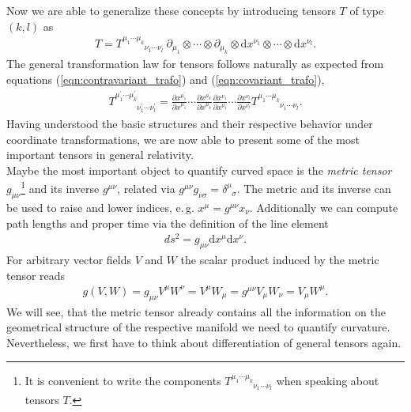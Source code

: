 Now we are able to generalize these concepts by introducing tensors $T$ of type $(k,l)$ as
\begin{align}
T=T_{\phantom{\mu_{1} \cdots \mu_{k}}\nu_{1} \cdots \nu_{l}}^{\mu_{1} \cdots \mu_{k}} \ \partial_{\mu_{1}} \otimes \cdots \otimes \partial_{\mu_{k}} \otimes \mathrm{d} x^{\nu_{1}} \otimes \cdots \otimes \mathrm{d} x^{\nu_{l}}.
\end{align}
The general transformation law for tensors follows naturally as expected from equations (\ref{eqn:contravariant_trafo}) and (\ref{eqn:covariant_trafo}),
\begin{align}
	T_{\phantom{\mu_{1}^{\prime} \cdots \mu_{k}^{\prime}}\nu_{1}^{\prime} \cdots \nu_{l}^{\prime}}^{\mu_{1}^{\prime} \cdots \mu_{k}^{\prime}}=\frac{\partial x^{\mu_{1}^{\prime}}}{\partial x^{\mu_{1}}} \cdots \frac{\partial x^{\mu_{k}^{\prime}}}{\partial x^{\mu_{k}}} \frac{\partial x^{\nu_{1}}}{\partial x^{\nu_{1}^{\prime}}} \cdots \frac{\partial x^{\nu_{l}}}{\partial x^{\nu_{l}^{\prime}}} T^{\mu_{1} \cdots \mu_{k}}_{\phantom{\mu_{1} \cdots \mu_{k}}\nu_{1} \cdots \nu_{l}}.
\end{align}
Having understood the basic structures and their respective behavior under coordinate transformations, we are now able to present some of the most important tensors in general relativity. \\
Maybe the most important object to quantify curved space is the \textit{metric tensor} $g_{\mu\nu}$\footnote{It is convenient to write the components $T_{\phantom{\mu_{1} \cdots \mu_{k}}\nu_{1} \cdots \nu_{l}}^{\mu_{1} \cdots \mu_{k}}$ when speaking about tensors $T$.} and its inverse  $g^{\mu\nu}$, related via $g^{\mu\nu}g_{\nu\sigma} = \delta^{\mu}_{\phantom{\mu}\sigma}$. The metric and its inverse can be used to raise and lower indices, e.\,g. $x^{\mu} = g^{\mu\nu}x_{\nu}$. Additionally we can compute path lengths and proper time via the definition of the line element 
\begin{align}
	d s^{2}=g_{\mu \nu} \mathrm{d} x^{\mu} \mathrm{d} x^{\nu}.
\end{align}
For arbitrary vector fields $V$ and $W$ the scalar product induced by the metric tensor reads
\begin{align}
	g(V,W) = g_{\mu\nu}V^{\mu}W^{\nu} = V^{\mu}W_{\mu}= g^{\mu\nu}V_{\mu}W_{\nu} = V_{\mu}W^{\mu}.
\end{align}
We will see, that the metric tensor already contains all the information on the geometrical structure of the respective manifold we need to quantify curvature. Nevertheless, we first have to think about differentiation of general tensors again. \\
